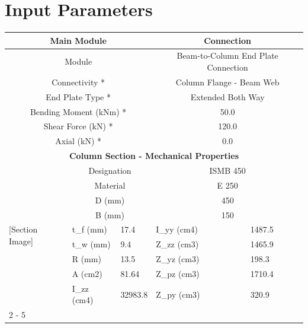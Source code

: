 \documentclass{article}%
\begin{document}
%
\normalsize%
\fontsize{8}{12}%
\selectfont%
\pagestyle{header}%
\section{Input Parameters}%
\label{sec:InputParameters}%
\renewcommand{\arraystretch}{1.2}%
\begin{longtable}{|p{5cm}|p{2.5cm}|p{1.5cm}|p{3cm}|p{3.5cm}|}%
\hline%
\hline%
\multicolumn{3}{|c|}{Main Module}&\multicolumn{2}{|c|}{Connection}\\%
\hline%
\hline%
\multicolumn{3}{|c|}{Module}&\multicolumn{2}{|c|}{Beam{-}to{-}Column End Plate Connection}\\%
\hline%
\hline%
\multicolumn{3}{|c|}{Connectivity *}&\multicolumn{2}{|c|}{Column Flange {-} Beam Web}\\%
\hline%
\hline%
\multicolumn{3}{|c|}{End Plate Type *}&\multicolumn{2}{|c|}{Extended Both Way}\\%
\hline%
\hline%
\multicolumn{3}{|c|}{Bending Moment (kNm) *}&\multicolumn{2}{|c|}{50.0}\\%
\hline%
\hline%
\multicolumn{3}{|c|}{Shear Force (kN) *}&\multicolumn{2}{|c|}{120.0}\\%
\hline%
\hline%
\multicolumn{3}{|c|}{Axial (kN) *}&\multicolumn{2}{|c|}{0.0}\\%
\hline%
\hline%
\multicolumn{5}{|c|}{\textbf{Column Section {-} Mechanical Properties}}\\%
\hline%
\hline%
\multirow{9}{*}{{[}Section Image{]}}&\multicolumn{2}{|c|}{Designation}&\multicolumn{2}{|c|}{ISMB 450}\\%
\cline{2%
-%
5}%
&\multicolumn{2}{|c|}{Material}&\multicolumn{2}{|c|}{E 250}\\%
\cline{2%
-%
5}%
&\multicolumn{2}{|c|}{D (mm)}&\multicolumn{2}{|c|}{450}\\%
\cline{2%
-%
5}%
&\multicolumn{2}{|c|}{B (mm)}&\multicolumn{2}{|c|}{150}\\%
\cline{2%
-%
5}%
&t_f (mm)&17.4&I_yy (cm4)&1487.5\\%
\cline{2%
-%
5}%
&t_w (mm)&9.4&Z_zz (cm3)&1465.9\\%
\cline{2%
-%
5}%
&R (mm)&13.5&Z_yz (cm3)&198.3\\%
\cline{2%
-%
5}%
&A (cm2)&81.64&Z_pz (cm3)&1710.4\\%
\cline{2%
-%
5}%
&I_zz (cm4)&32983.8&Z_py (cm3)&320.9\\%
\cline{2%
-%
5}%
\hline%
\multicolumn{5}{|c|}{\textbf{Beam Section {-} Mechanical Properties}}\\%

\end{longtable}
\end{document}
